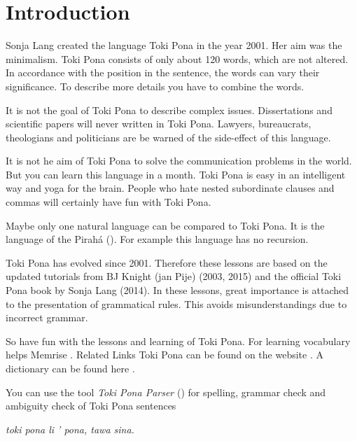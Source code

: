 \section{Introduction}
%
Sonja Lang created the language Toki Pona in the year 2001. 
Her aim was the minimalism. 
Toki Pona consists of only about 120 words, which are not altered. 
In accordance with the position in the sentence, the words can vary their significance. 
To describe more details you have to combine the words.

It is not the goal of Toki Pona to describe complex issues. 
Dissertations and scientific papers will never written in Toki Pona. 
Lawyers, bureaucrats, theologians and politicians are be warned of the side-effect of this language.

It is not he aim of Toki Pona to solve the communication problems in the world. 
But you can learn this language in a month. 
Toki Pona is easy in an intelligent way and yoga for the brain. 
People who hate nested subordinate clauses and commas will certainly have fun with Toki Pona.

Maybe only one natural language can be compared to Toki Pona. 
It is the language of the Pirah\'{a} (\cite{www:piraha:01}). 
For example this language has no recursion. 

%
%
Toki Pona has evolved since 2001. 
Therefore these lessons are based on the updated tutorials from BJ Knight (jan Pije) \cite{www:Pije:01} (2003, 2015) and the official Toki Pona book \cite{www:tokipona.org} by Sonja Lang (2014).
In these lessons, great importance is attached to the presentation of grammatical rules. 
This avoids misunderstandings due to incorrect grammar.

So have fun with the lessons and learning of Toki Pona. 
For learning vocabulary helps Memrise \cite{www:memrise:01}. Related Links Toki Pona can be found on the website \cite{www:rowa:01}. 
A dictionary can be found here \cite{www:rowa:01}. 

You can use the tool \textit{Toki Pona Parser} (\cite{www:rowa:02}) for spelling, grammar check and ambiguity check of Toki Pona sentences 


\textit{toki pona li ' pona, tawa sina.}
%

